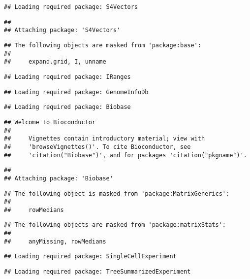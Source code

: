 \documentclass[
  oneside]{book}
\begin{document}
\begin{verbatim}
## Loading required package: S4Vectors
\end{verbatim}

\begin{verbatim}
## 
## Attaching package: 'S4Vectors'
\end{verbatim}

\begin{verbatim}
## The following objects are masked from 'package:base':
## 
##     expand.grid, I, unname
\end{verbatim}

\begin{verbatim}
## Loading required package: IRanges
\end{verbatim}

\begin{verbatim}
## Loading required package: GenomeInfoDb
\end{verbatim}

\begin{verbatim}
## Loading required package: Biobase
\end{verbatim}

\begin{verbatim}
## Welcome to Bioconductor
## 
##     Vignettes contain introductory material; view with
##     'browseVignettes()'. To cite Bioconductor, see
##     'citation("Biobase")', and for packages 'citation("pkgname")'.
\end{verbatim}

\begin{verbatim}
## 
## Attaching package: 'Biobase'
\end{verbatim}

\begin{verbatim}
## The following object is masked from 'package:MatrixGenerics':
## 
##     rowMedians
\end{verbatim}

\begin{verbatim}
## The following objects are masked from 'package:matrixStats':
## 
##     anyMissing, rowMedians
\end{verbatim}

\begin{verbatim}
## Loading required package: SingleCellExperiment
\end{verbatim}

\begin{verbatim}
## Loading required package: TreeSummarizedExperiment
\end{verbatim}
\end{document}
